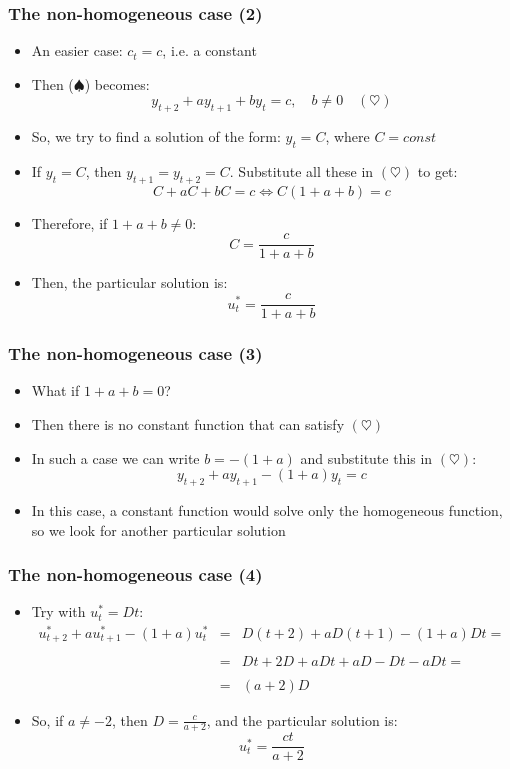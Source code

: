 \documentclass[10pt,usenames,dvipsnames]{beamer}
\theoremstyle{plain}
\theoremstyle{definition}
\begin{document}
\begin{frame}[fragile]
\frametitle{The non-homogeneous case (2)}
\begin{itemize}
	\item An easier case: $c_{t} = c$, i.e. a constant
	\item Then ($\spadesuit$) becomes: 
	\[
		y_{t+2} + a y_{t+1} + b y_{t} = c, \quad b \neq 0 \quad (\heartsuit)
	\]
	\item So, we try to find a solution of the form: $y_{t} = C$, where $C = const$
	\item If $y_{t} = C$, then $y_{t+1} = y_{t+2} = C$. Substitute all these in $(\heartsuit)$ to get:
	\[
		C + a C + b C = c \Leftrightarrow C(1 + a + b) = c
	\]
	\item Therefore, if $1 + a + b \neq 0$:
	\[
		C = \frac{c}{1 + a + b} 
	\]
	\item Then, the particular solution is:
	\[
		u_{t}^{*} = \frac{c}{1 + a + b}
	\]
\end{itemize}
\end{frame}

\begin{frame}[fragile]
\frametitle{The non-homogeneous case (3)}
\begin{itemize}
	\item What if $1 + a + b = 0$?
	\item Then there is no constant function that can satisfy $(\heartsuit)$
	\item In such a case we can write $b = -(1 + a)$ and substitute this in $(\heartsuit)$:
	\[
		y_{t+2} + a y_{t+1} - (1 + a) y_{t} = c
	\]
	\item In this case, a constant function would solve only the homogeneous function, so we look for another particular solution
\end{itemize}
\end{frame}

\begin{frame}[fragile]
\frametitle{The non-homogeneous case (4)}
\begin{itemize}
	\item Try with $u_{t}^{*} = Dt$:
	\[
	\begin{array}{lcl}
		u_{t+2}^{*} + a u_{t+1}^{*} - (1 + a) u_{t}^{*} & = & D(t+2) + a D(t+1) - (1 + a)Dt = \\
		\quad\\
		& = & Dt + 2D + aDt + aD - Dt - aDt = \\
		\quad\\
		& = & (a + 2)D
	\end{array}
	\]
	\item So, if $a \neq -2$, then $\displaystyle D = \frac{c}{a + 2}$, and the particular solution is:
	\[
		u_{t}^{*} = \frac{c t}{a + 2}
	\]
	
\end{itemize}
\end{frame}
\end{document}
